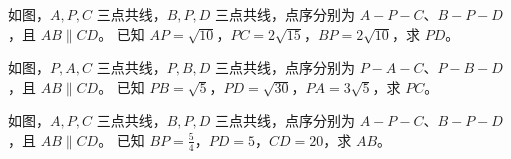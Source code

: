 \documentclass{exam-zh}
\begin{document}

\begin{problem}[points=10]
  \noindent
  \begin{minipage}[t]{\dimexpr\linewidth-60mm-6mm\relax}
    \vspace{0pt}
    如图，$A,P,C$ 三点共线，$B,P,D$ 三点共线，点序分别为 $A-P-C$、$B-P-D$，且 $AB\parallel CD$。
已知 $AP=\sqrt{10}$，$PC=2\sqrt{15}$，$BP=2\sqrt{10}$，求 $PD$。
    
  \end{minipage}\hfill
  \begin{diagramcoltikz}{60mm}{先看平行边方向，再判断 A 字型或 8 字型及对应边。}
  }
  \end{diagramcoltikz}
  \par\medskip
  \answerarea[42mm]
\end{problem}



\begin{problem}[points=10]
  \noindent
  \begin{minipage}[t]{\dimexpr\linewidth-60mm-6mm\relax}
    \vspace{0pt}
    如图，$P,A,C$ 三点共线，$P,B,D$ 三点共线，点序分别为 $P-A-C$、$P-B-D$，且 $AB\parallel CD$。
已知 $PB=\sqrt{5}$，$PD=\sqrt{30}$，$PA=3\sqrt{5}$，求 $PC$。
    
  \end{minipage}\hfill
  \begin{diagramcoltikz}{60mm}{先看平行边方向，再判断 A 字型或 8 字型及对应边。}
  }
  \end{diagramcoltikz}
  \par\medskip
  \answerarea[42mm]
\end{problem}



\begin{problem}[points=10]
  \noindent
  \begin{minipage}[t]{\dimexpr\linewidth-60mm-6mm\relax}
    \vspace{0pt}
    如图，$A,P,C$ 三点共线，$B,P,D$ 三点共线，点序分别为 $A-P-C$、$B-P-D$，且 $AB\parallel CD$。
已知 $BP=\frac{5}{4}$，$PD=5$，$CD=20$，求 $AB$。
    
  \end{minipage}\hfill
  \begin{diagramcoltikz}{60mm}{先看平行边方向，再判断 A 字型或 8 字型及对应边。}
  }
  \end{diagramcoltikz}
  \par\medskip
  \answerarea[42mm]
\end{problem}
\end{document}
